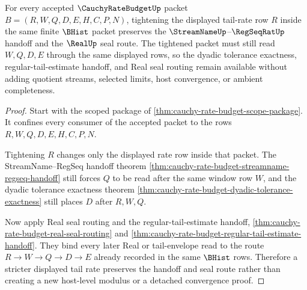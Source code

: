 \begin{theorem}
\label{thm:cauchy-rate-budget-tail-monotonicity}
For every accepted $\CauchyRateBudgetUp$ packet $B=(R,W,Q,D,E,H,C,P,N)$, tightening the displayed tail-rate row $R$ inside the same finite $\BHist$ packet preserves the $\StreamNameUp$--$\RegSeqRatUp$ handoff and the $\RealUp$ seal route. The tightened packet must still read $W,Q,D,E$ through the same displayed rows, so the dyadic tolerance exactness, regular-tail-estimate handoff, and Real seal routing remain available without adding quotient streams, selected limits, host convergence, or ambient completeness.
\end{theorem}
\begin{proof}
Start with the scoped package of \autoref{thm:cauchy-rate-budget-scope-package}. It confines every consumer of the accepted packet to the rows $R,W,Q,D,E,H,C,P,N$.

Tightening $R$ changes only the displayed rate row inside that packet. The StreamName--RegSeq handoff theorem \autoref{thm:cauchy-rate-budget-streamname-regseq-handoff} still forces $Q$ to be read after the same window row $W$, and the dyadic tolerance exactness theorem \autoref{thm:cauchy-rate-budget-dyadic-tolerance-exactness} still places $D$ after $R,W,Q$.

Now apply Real seal routing and the regular-tail-estimate handoff, \autoref{thm:cauchy-rate-budget-real-seal-routing} and \autoref{thm:cauchy-rate-budget-regular-tail-estimate-handoff}. They bind every later Real or tail-envelope read to the route $R \to W \to Q \to D \to E$ already recorded in the same $\BHist$ rows. Therefore a stricter displayed tail rate preserves the handoff and seal route rather than creating a new host-level modulus or a detached convergence proof.
\end{proof}

